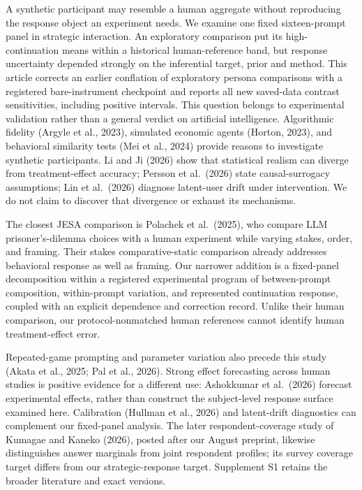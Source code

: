 \documentclass[11pt]{article}
\begin{document}
A synthetic participant may resemble a human aggregate without
reproducing the response object an experiment needs. We examine one
fixed sixteen-prompt panel in strategic interaction. An exploratory
comparison put its high-continuation means within a historical
human-reference band, but response uncertainty depended strongly on the
inferential target, prior and method. This article corrects an earlier
conflation of exploratory persona comparisons with a registered
bare-instrument checkpoint and reports all new saved-data contrast
sensitivities, including positive intervals. This question belongs to
experimental validation rather than a general verdict on artificial
intelligence. Algorithmic fidelity (Argyle et al., 2023), simulated
economic agents (Horton, 2023), and behavioral similarity tests (Mei et
al., 2024) provide reasons to investigate synthetic participants. Li and
Ji (2026) show that statistical realism can diverge from
treatment-effect accuracy; Persson et al.~(2026) state causal-surrogacy
assumptions; Lin et al.~(2026) diagnose latent-user drift under
intervention. We do not claim to discover that divergence or exhaust its
mechanisms.

The closest JESA comparison is Polachek et al.~(2025), who compare LLM
prisoner's-dilemma choices with a human experiment while varying stakes,
order, and framing. Their stakes comparative-static comparison already
addresses behavioral response as well as framing. Our narrower addition
is a fixed-panel decomposition within a registered experimental program
of between-prompt composition, within-prompt variation, and represented
continuation response, coupled with an explicit dependence and
correction record. Unlike their human comparison, our
protocol-nonmatched human references cannot identify human
treatment-effect error.

Repeated-game prompting and parameter variation also precede this study
(Akata et al., 2025; Pal et al., 2026). Strong effect forecasting across
human studies is positive evidence for a different use: Ashokkumar et
al.~(2026) forecast experimental effects, rather than construct the
subject-level response surface examined here. Calibration (Hullman et
al., 2026) and latent-drift diagnostics can complement our fixed-panel
analysis. The later respondent-coverage study of Kumagae and Kaneko
(2026), posted after our August preprint, likewise distinguishes answer
marginals from joint respondent profiles; its survey coverage target
differs from our strategic-response target. Supplement S1 retains the
broader literature and exact versions.
\end{document}
